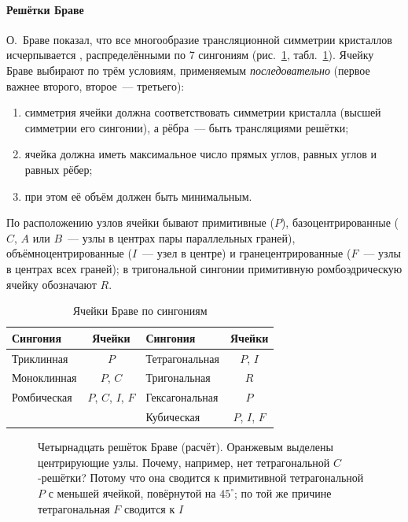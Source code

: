 \paragraph{Решётки Браве}
О.~Браве показал, что все многообразие трансляционной симметрии
кристаллов исчерпывается , распределёнными по
7 сингониям (рис.~\ref{fig:bravais}, табл.~\ref{tab:bravais}). Ячейку Браве
выбирают по трём условиям, применяемым \emph{последовательно} (первое
важнее второго, второе~— третьего):
\begin{enumerate}
\item симметрия ячейки должна соответствовать симметрии кристалла
(высшей симметрии его сингонии), а рёбра~— быть трансляциями решётки;
\item ячейка должна иметь максимальное число прямых углов, равных углов
и равных рёбер;
\item при этом её объём должен быть минимальным.
\end{enumerate}
По расположению узлов ячейки бывают примитивные ($P$), базоцентрированные
($C$, $A$ или $B$~— узлы в центрах пары параллельных граней),
объёмноцентрированные ($I$~— узел в центре) и гранецентрированные ($F$~—
узлы в центрах всех граней); в тригональной сингонии примитивную
ромбоэдрическую ячейку обозначают $R$.

\begin{table}[ht]
\centering
\caption{Ячейки Браве по сингониям}\label{tab:bravais}
\small
\begin{tabular}{@{}lc@{\qquad}lc@{}}
\toprule
Сингония & Ячейки & Сингония & Ячейки\\
\midrule
Триклинная & $P$ & Тетрагональная & $P$, $I$\\
Моноклинная & $P$, $C$ & Тригональная & $R$\\
Ромбическая & $P$, $C$, $I$, $F$ & Гексагональная & $P$\\
 & & Кубическая & $P$, $I$, $F$\\
\bottomrule
\end{tabular}
\end{table}

\begin{figure}[p]
\centering
{}
\begin{tikzpicture}[scale=1.15]
  
\end{tikzpicture}
\caption{Четырнадцать решёток Браве (расчёт). Оранжевым выделены
центрирующие узлы. Почему, например, нет тетрагональной $C$-решётки?
Потому что она сводится к примитивной тетрагональной $P$ с меньшей
ячейкой, повёрнутой на $45^\circ$; по той же причине тетрагональная $F$
сводится к $I$}
\label{fig:bravais}
\end{figure}

